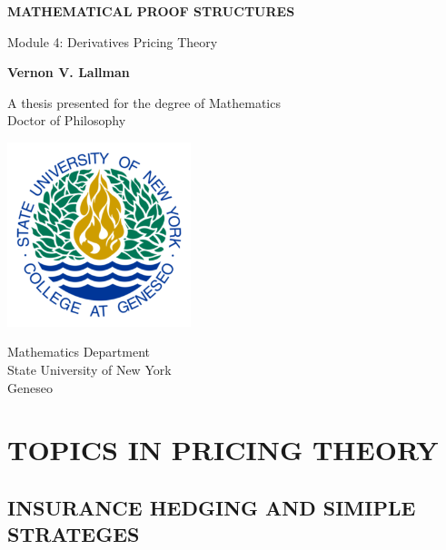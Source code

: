 \documentclass{book}
\theoremstyle{definition}
\theoremstyle{remark}
\begin{document}
\begin{titlepage}
    \begin{center}
        \vspace*{1cm}
        
        \textbf{MATHEMATICAL PROOF STRUCTURES}
        
        \vspace{0.5cm}
        Module 4: Derivatives Pricing Theory
        
        \vspace{1.5cm}
        
        \textbf{Vernon V. Lallman}
        
        \vfill
        
        A thesis presented for the degree of Mathematics\\
        Doctor of Philosophy
        
        \vspace{0.8cm}
        
        \includegraphics[width=0.4\textwidth]{university}
        
        Mathematics Department\\
        State University of New York \\
        Geneseo\\
        \date{\today}
        
    \end{center}
\end{titlepage}

\tableofcontents

\newpage
\chapter{TOPICS IN PRICING THEORY}

\section{INSURANCE HEDGING AND SIMIPLE STRATEGES}
\end{document}

